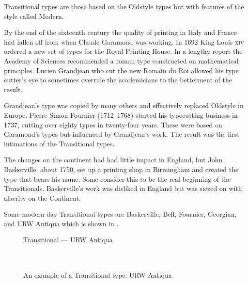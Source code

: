 \documentclass[10pt,a4paper,oneside,extrafontsizes]{memoir}%
\begin{document}
\begin{paracol}{2}
\switchEng
    Transitional types are those based on the Oldstyle 
types but with features of the style called Modern.

    By the end of the sixteenth century the quality of printing in Italy 
and France had fallen off from when Claude Garamond 
was working. In 1692
King Louis \textsc{xiv} ordered a new set of types for the Royal Printing
House. In a lengthy report the Academy of Sciences recommended a roman type
constructed on mathematical principles. 
Lucien Grandjean who cut the
new Romain du Roi allowed his type cutter's eye to 
sometimes overrule the 
academicians to the betterment of the result.

    Grandjean's type was copied by many others and effectively replaced 
Oldstyle in Europe. Pierre Simon Fournier 
(1712--1768) started his typecutting 
business in 1737, cutting over eighty types in twenty-four years. These were
based on Garamond's types but influenced by Grandjean's work. The result was
the first intimations of the Transitional types.

    The changes on the continent had had little impact in England, but John
Baskerville, about 1750, set up a printing shop 
in Birmingham and created the type that bears his name. Some consider this
to be the real beginning of the Transitionals. Baskerville's work was
disliked in England but was siezed on with alacrity on the Continent.

    Some modern day Transitional types are 
Baskerville, 
Bell, 
Fournier,
Georgian,
and URW Antiqua which is shown in .
\end{paracol}

\begin{figure}
\centering
{\centering{}\selectfont
  Transitional --- URW Antiqua \\
  \UCalphabet \\
  \LCalphabet \\
  \fox\par}
\caption{An example of a Transitional type: URW Antiqua} 
   \label{fig:antiqua}
\end{figure}
\end{document}
